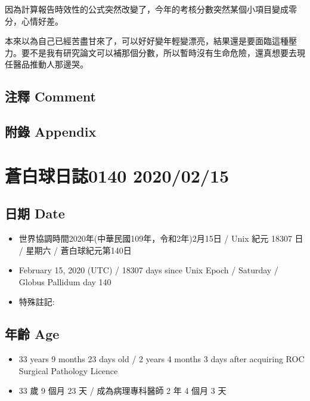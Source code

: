 \documentclass[a5paper, 12pt
]{book}
\providecommand{\tightlist}{%
  \setlength{\itemsep}{0pt}\setlength{\parskip}{0pt}}
\begin{document}
因為計算報告時效性的公式突然改變了，今年的考核分數突然某個小項目變成零分，心情好差。

本來以為自己已經苦盡甘來了，可以好好變年輕變漂亮，結果還是要面臨這種壓力。要不是我有研究論文可以補那個分數，所以暫時沒有生命危險，還真想要去現任醫品推動人那邊哭。

\hypertarget{ux6ce8ux91cb-comment-74}{%
\subsection{注釋 Comment}\label{ux6ce8ux91cb-comment-74}}

\hypertarget{ux9644ux9304-appendix-75}{%
\subsection{附錄 Appendix}\label{ux9644ux9304-appendix-75}}

\hypertarget{ux84bcux767dux7403ux65e5ux8a8c0140-20200215}{%
\section{蒼白球日誌0140
2020/02/15}\label{ux84bcux767dux7403ux65e5ux8a8c0140-20200215}}

\hypertarget{ux65e5ux671f-date-76}{%
\subsection{日期 Date}\label{ux65e5ux671f-date-76}}

\begin{itemize}
\tightlist
\item
  世界協調時間2020年(中華民國109年，令和2年)2月15日 / Unix 紀元 18307 日
  / 星期六 / 蒼白球紀元第140日
\item
  February 15, 2020 (UTC) / 18307 days since Unix Epoch / Saturday /
  Globus Pallidum day 140
\item
  特殊註記:
\end{itemize}

\hypertarget{ux5e74ux9f61-age-76}{%
\subsection{年齡 Age}\label{ux5e74ux9f61-age-76}}

\begin{itemize}
\tightlist
\item
  33 years 9 months 23 days old / 2 years 4 months 3 days after
  acquiring ROC Surgical Pathology Licence
\item
  33 歲 9 個月 23 天 / 成為病理專科醫師 2 年 4 個月 3 天
\end{itemize}
\end{document}
